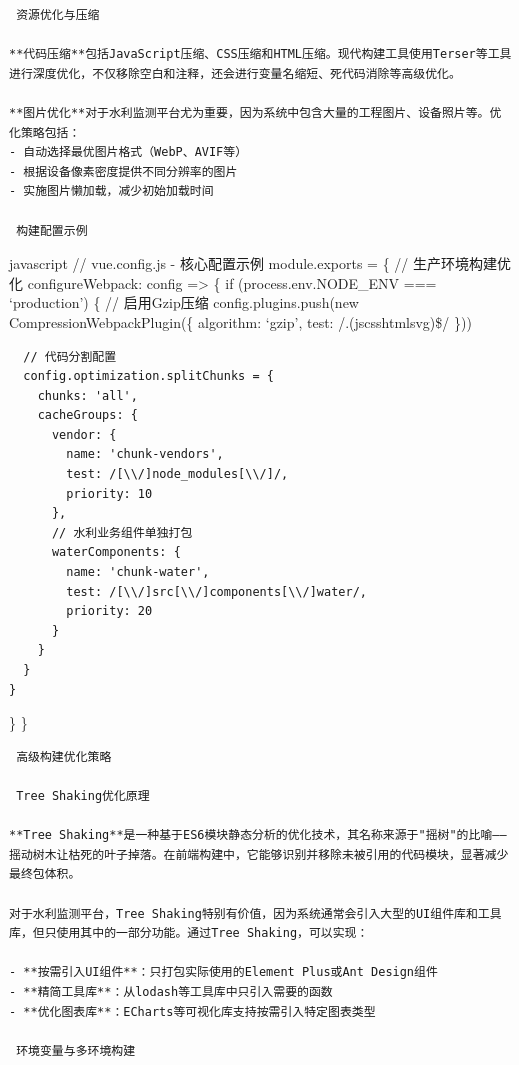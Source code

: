 {{\begin{lstlisting}
 资源优化与压缩

**代码压缩**包括JavaScript压缩、CSS压缩和HTML压缩。现代构建工具使用Terser等工具进行深度优化，不仅移除空白和注释，还会进行变量名缩短、死代码消除等高级优化。

**图片优化**对于水利监测平台尤为重要，因为系统中包含大量的工程图片、设备照片等。优化策略包括：
- 自动选择最优图片格式（WebP、AVIF等）
- 根据设备像素密度提供不同分辨率的图片
- 实施图片懒加载，减少初始加载时间

 构建配置示例
\end{lstlisting}

javascript // vue.config.js - 核心配置示例 module.exports = \{ // 生产环境构建优化 configureWebpack: config =\textgreater{} \{ if (process.env.NODE\_ENV === `production') \{ // 启用Gzip压缩 config.plugins.push(new CompressionWebpackPlugin(\{ algorithm: `gzip', test: /.(js\textbar css\textbar html\textbar svg)\$/ \}))

\begin{verbatim}
  // 代码分割配置
  config.optimization.splitChunks = {
    chunks: 'all',
    cacheGroups: {
      vendor: {
        name: 'chunk-vendors',
        test: /[\\/]node_modules[\\/]/,
        priority: 10
      },
      // 水利业务组件单独打包
      waterComponents: {
        name: 'chunk-water',
        test: /[\\/]src[\\/]components[\\/]water/,
        priority: 20
      }
    }
  }
}
\end{verbatim}

\} \}

\begin{lstlisting}
 高级构建优化策略

 Tree Shaking优化原理

**Tree Shaking**是一种基于ES6模块静态分析的优化技术，其名称来源于"摇树"的比喻——摇动树木让枯死的叶子掉落。在前端构建中，它能够识别并移除未被引用的代码模块，显著减少最终包体积。

对于水利监测平台，Tree Shaking特别有价值，因为系统通常会引入大型的UI组件库和工具库，但只使用其中的一部分功能。通过Tree Shaking，可以实现：

- **按需引入UI组件**：只打包实际使用的Element Plus或Ant Design组件
- **精简工具库**：从lodash等工具库中只引入需要的函数
- **优化图表库**：ECharts等可视化库支持按需引入特定图表类型

 环境变量与多环境构建


\end{lstlisting}}}
